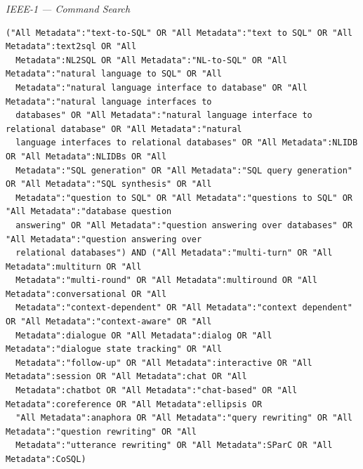\par\medskip\noindent\textit{IEEE-1 — Command Search}\par\nopagebreak
\begin{lstlisting}
("All Metadata":"text-to-SQL" OR "All Metadata":"text to SQL" OR "All Metadata":text2sql OR "All
  Metadata":NL2SQL OR "All Metadata":"NL-to-SQL" OR "All Metadata":"natural language to SQL" OR "All
  Metadata":"natural language interface to database" OR "All Metadata":"natural language interfaces to
  databases" OR "All Metadata":"natural language interface to relational database" OR "All Metadata":"natural
  language interfaces to relational databases" OR "All Metadata":NLIDB OR "All Metadata":NLIDBs OR "All
  Metadata":"SQL generation" OR "All Metadata":"SQL query generation" OR "All Metadata":"SQL synthesis" OR "All
  Metadata":"question to SQL" OR "All Metadata":"questions to SQL" OR "All Metadata":"database question
  answering" OR "All Metadata":"question answering over databases" OR "All Metadata":"question answering over
  relational databases") AND ("All Metadata":"multi-turn" OR "All Metadata":multiturn OR "All
  Metadata":"multi-round" OR "All Metadata":multiround OR "All Metadata":conversational OR "All
  Metadata":"context-dependent" OR "All Metadata":"context dependent" OR "All Metadata":"context-aware" OR "All
  Metadata":dialogue OR "All Metadata":dialog OR "All Metadata":"dialogue state tracking" OR "All
  Metadata":"follow-up" OR "All Metadata":interactive OR "All Metadata":session OR "All Metadata":chat OR "All
  Metadata":chatbot OR "All Metadata":"chat-based" OR "All Metadata":coreference OR "All Metadata":ellipsis OR
  "All Metadata":anaphora OR "All Metadata":"query rewriting" OR "All Metadata":"question rewriting" OR "All
  Metadata":"utterance rewriting" OR "All Metadata":SParC OR "All Metadata":CoSQL)
\end{lstlisting}

